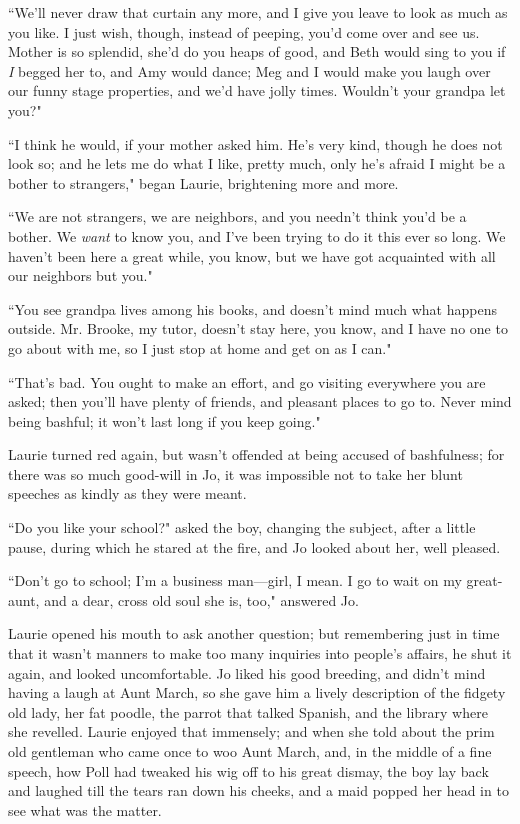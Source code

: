 ``We'll never draw that curtain any more, and I give you
leave to look as much as you like. I just wish, though, instead of
peeping, you'd come over and see us. Mother is so
splendid, she'd do you heaps of good, and Beth would
sing to you if \emph{I} begged her to, and Amy would dance; Meg and I
would make you laugh over our funny stage properties, and
we'd have jolly times. Wouldn't your
grandpa let you?"

``I think he would, if your mother asked him. He's very
kind, though he does not look so; and he lets me do what I like, pretty
much, only he's afraid I might be a bother to
strangers," began Laurie, brightening more and more.

``We are not strangers, we are neighbors, and you needn't
think you'd be a bother. We \emph{want} to know you, and
I've been trying to do it this ever so long. We
haven't been here a great while, you know, but we have
got acquainted with all our neighbors but you."

``You see grandpa lives among his books, and doesn't mind
much what happens outside. Mr. Brooke, my tutor, doesn't
stay here, you know, and I have no one to go about with me, so I just
stop at home and get on as I can."

``That's bad. You ought to make an effort, and go
visiting everywhere you are asked; then you'll have
plenty of friends, and pleasant places to go to. Never mind being
bashful; it won't last long if you keep going."

Laurie turned red again, but wasn't offended at being
accused of bashfulness; for there was so much good-will in Jo, it was
impossible not to take her blunt speeches as kindly as they were meant.

``Do you like your school?" asked the boy, changing the subject, after a
little pause, during which he stared at the fire, and Jo looked about
her, well pleased.

``Don't go to school; I'm a business
man---girl, I mean. I go to wait on my great-aunt, and a dear, cross old
soul she is, too," answered Jo.

Laurie opened his mouth to ask another question; but remembering just in
time that it wasn't manners to make too many inquiries
into people's affairs, he shut it again, and looked
uncomfortable. Jo liked his good breeding, and didn't
mind having a laugh at Aunt March, so she gave him a lively description
of the fidgety old lady, her fat poodle, the parrot that talked Spanish,
and the library where she revelled. Laurie enjoyed that immensely; and
when she told about the prim old gentleman who came once to woo Aunt
March, and, in the middle of a fine speech, how Poll had tweaked his wig
off to his great dismay, the boy lay back and laughed till the tears ran
down his cheeks, and a maid popped her head in to see what was the
matter.

